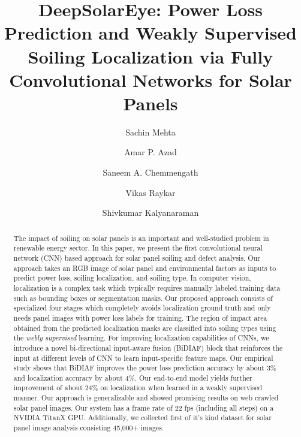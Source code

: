 \documentclass[10pt,twocolumn,letterpaper]{article}
\begin{document}
\title{DeepSolarEye: Power Loss Prediction and Weakly Supervised Soiling Localization via Fully Convolutional Networks for Solar Panels}


\author[1]{Sachin Mehta}
\author[2]{Amar P. Azad}
\author[2]{Saneem A. Chemmengath}
\author[2]{Vikas Raykar}
\author[2]{Shivkumar Kalyanaraman}

\maketitle
\ifwacvfinal\thispagestyle{empty}\fi


\begin{abstract}
The impact of soiling on solar panels is an important and well-studied problem in renewable energy sector. In this paper, we present the first convolutional neural network (CNN) based approach for solar panel soiling and defect analysis. Our approach takes an RGB image of solar panel and environmental factors as inputs to predict power loss, soiling localization, and soiling type. In computer vision, localization is a complex task which typically requires manually labeled training data such as bounding boxes or segmentation masks. Our proposed approach consists of specialized four stages which completely avoids localization ground truth and only needs panel images with power loss labels for training. The region of impact area obtained from the predicted localization masks are classified into soiling types using the \textit{webly supervised} learning. For improving localization capabilities of CNNs, we introduce a novel bi-directional input-aware fusion (BiDIAF) block that reinforces the input at different levels of CNN to learn input-specific feature maps. Our empirical study shows that BiDIAF improves the power loss prediction accuracy by about 3\%  and localization accuracy by about 4\%. Our end-to-end model yields further improvement of about 24\% on localization when learned in a weakly supervised manner. Our approach is generalizable and showed promising results on web crawled solar panel images. Our system has a frame rate of 22 fps (including all steps) on a NVIDIA TitanX GPU. Additionally, we collected first of it's kind dataset for solar panel image analysis consisting 45,000+ images.
\end{abstract}

\vspace{-2mm}
\end{document}
